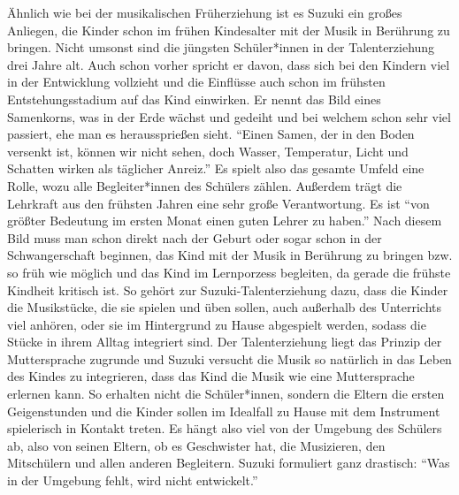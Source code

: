 Ähnlich wie bei der musikalischen Früherziehung ist es Suzuki ein großes
Anliegen, die Kinder schon im frühen Kindesalter mit der Musik in Berührung zu
bringen. Nicht umsonst sind die jüngsten Schüler*innen in der Talenterziehung drei
Jahre alt. Auch schon vorher spricht er davon, dass sich bei den Kindern viel in
der Entwicklung vollzieht und die Einflüsse auch schon im frühsten
Entstehungsstadium auf das Kind einwirken. Er nennt das Bild eines Samenkorns,
was in der Erde wächst und gedeiht und bei welchem schon sehr viel passiert, ehe
man es heraussprießen sieht. \enquote{Einen Samen, der in den Boden versenkt
ist, können wir nicht sehen, doch Wasser, Temperatur, Licht und Schatten wirken
als täglicher Anreiz.}\autocite[17]{suzuki:erziehung_ist_liebe} Es spielt also
das gesamte Umfeld eine Rolle, wozu alle Begleiter*innen des Schülers zählen. Außerdem
trägt die Lehrkraft aus den frühsten Jahren eine sehr große Verantwortung. Es ist
\enquote{von größter Bedeutung im ersten Monat einen guten Lehrer zu haben.}
\autocite[21]{suzuki:erziehung_ist_liebe} Nach diesem Bild muss man schon direkt
nach der Geburt oder sogar schon in der Schwangerschaft beginnen, das Kind mit
der Musik in Berührung zu bringen bzw. so früh wie möglich und das Kind im
Lernporzess begleiten, da gerade die frühste Kindheit kritisch ist.
\autocite[25]{suzuki:erziehung_ist_liebe} So gehört zur Suzuki-Talenterziehung
dazu, dass die Kinder die Musikstücke, die sie spielen und üben sollen, auch
außerhalb des Unterrichts viel anhören, oder sie im Hintergrund zu Hause
abgespielt werden, sodass die Stücke in ihrem Alltag integriert sind. Der
Talenterziehung liegt das Prinzip der Muttersprache zugrunde und Suzuki versucht
die Musik so natürlich in das Leben des Kindes zu integrieren, dass das Kind die
Musik wie eine Muttersprache erlernen kann.  So erhalten nicht die
Schüler*innen, sondern die Eltern die ersten Geigenstunden und die Kinder sollen
im Idealfall zu Hause mit dem Instrument spielerisch in Kontakt treten.
\autocite[75]{suzuki:erziehung_ist_liebe} Es hängt also viel von der Umgebung
des Schülers ab, also von seinen Eltern, ob es Geschwister hat, die Musizieren,
den Mitschülern und allen anderen Begleitern. Suzuki formuliert ganz drastisch:
\enquote{Was in der Umgebung fehlt, wird nicht entwickelt.}
\autocite[25]{suzuki:erziehung_ist_liebe}

